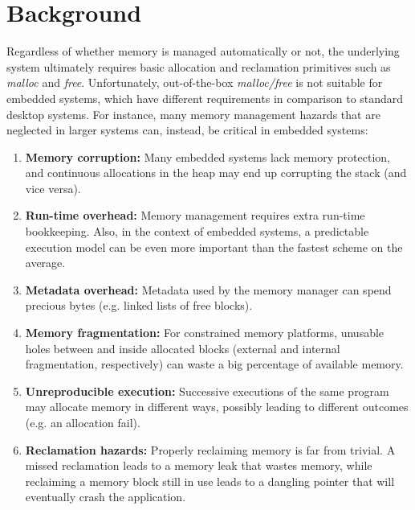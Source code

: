 \documentclass{sig-alternate-ipsn13}
\begin{document}
\begin{comment}
As far as we know, the only XXX programming language targeting WSNs that 
supports automatic memory management is Java~\cite{wsn.java} (through the 
\emph{Djarelling}~\cite{wsn.djar} and \emph{Takatuka} VMs).

all threads share a single stack~\cite{wsn.java}
quais os problemas disso?
\end{comment}

\section{Background}

Regardless of whether memory is managed automatically or not, the underlying 
system ultimately requires basic allocation and reclamation primitives such as 
\emph{malloc} and \emph{free}.
%
Unfortunately, out-of-the-box \emph{malloc/free} is not suitable for embedded 
systems, which have different requirements in comparison to standard desktop 
systems.
%
For instance, many memory management hazards that are neglected in larger 
systems can, instead, be critical in embedded systems:

\begin{enumerate}
\item \textbf{Memory corruption:}
    Many embedded systems lack memory protection, and continuous allocations in 
    the heap may end up corrupting the stack (and vice versa).

\item \textbf{Run-time overhead:}
    Memory management requires extra run-time bookkeeping.
    Also, in the context of embedded systems, a predictable execution model can 
    be even more important than the fastest scheme on the average.

\item \textbf{Metadata overhead:}
    Metadata used by the memory manager can spend precious bytes (e.g. linked 
    lists of free blocks).

\item \textbf{Memory fragmentation:}
    For constrained memory platforms, unusable holes between and inside 
    allocated blocks (external and internal fragmentation, respectively) can 
waste a big percentage of available memory.

\item \textbf{Unreproducible execution:}
    Successive executions of the same program may allocate memory in different 
    ways, possibly leading to different outcomes (e.g. an allocation fail).

\item \textbf{Reclamation hazards:}
    Properly reclaiming memory is far from trivial.
    A missed reclamation leads to a memory leak that wastes memory, while 
    reclaiming a memory block still in use leads to a dangling pointer that 
will eventually crash the application.
\end{enumerate}
\end{document}
